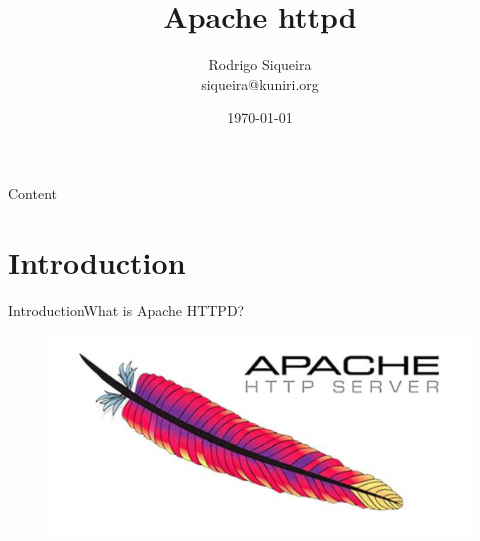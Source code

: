 \documentclass[10pt]{beamer}
\title[] %
{ %
      \textbf{Apache httpd}
}
\subtitle[Managements]
{
}
\author[Rodrigo Siqueira]
{      Rodrigo Siqueira\\
      {\ttfamily siqueira@kuniri.org}
}
\institute[]
{
      Institute of Mathematics and Statistics\\
      University of Sao Paulo\\

}
\date{\today}
\begin{document}

{\1%
\begin{frame}
  \titlepage %
\end{frame}}

\begin{frame}[shrink]{Content}{}
  \tableofcontents
\end{frame}

\section{Introduction}
\begin{frame}{Introduction}{What is Apache HTTPD?}
  \begin{figure}[ht]
    \centering
    \includegraphics[width=1\textwidth, keepaspectratio=true]{images/apachehttpd.jpg}
  \end{figure}
\end{frame}
\end{document}
